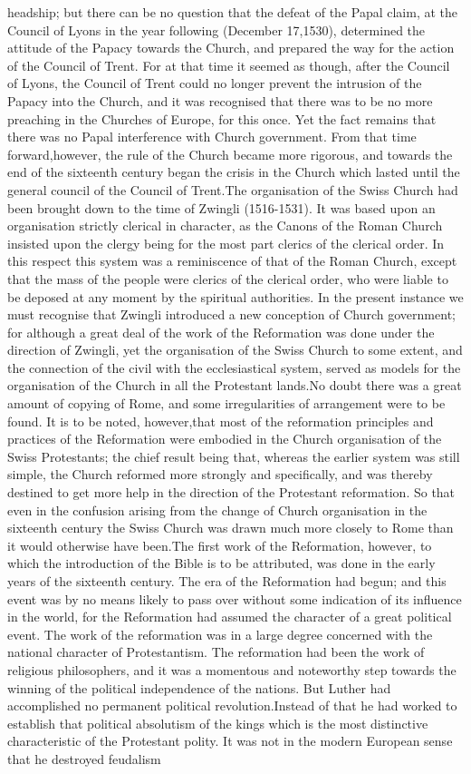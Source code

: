 \documentclass[a4paper]{article}
\begin{document}
headship; but there can be no question that the defeat of the Papal claim, at the Council of Lyons in the year following (December 17,1530), determined the attitude of the Papacy towards the Church, and prepared the way for the action of the Council of Trent. For at that time it seemed as though, after the Council of Lyons, the Council of Trent could no longer prevent the intrusion of the Papacy into the Church, and it was recognised that there was to be no more preaching in the Churches of Europe, for this once. Yet the fact remains that there was no Papal interference with Church government. From that time forward,however, the rule of the Church became more rigorous, and towards the end of the sixteenth century began the crisis in the Church which lasted until the general council of the Council of Trent.The organisation of the Swiss Church had been brought down to the time of Zwingli (1516-1531). It was based upon an organisation strictly clerical in character, as the Canons of the Roman Church insisted upon the clergy being for the most part clerics of the clerical order. In this respect this system was a reminiscence of that of the Roman Church, except that the mass of the people were clerics of the clerical order, who were liable to be deposed at any moment by the spiritual authorities. In the present instance we must recognise that Zwingli introduced a new conception of Church government; for although a great deal of the work of the Reformation was done under the direction of Zwingli, yet the organisation of the Swiss Church to some extent, and the connection of the civil with the ecclesiastical system, served as models for the organisation of the Church in all the Protestant lands.No doubt there was a great amount of copying of Rome, and some irregularities of arrangement were to be found. It is to be noted, however,that most of the reformation principles and practices of the Reformation were embodied in the Church organisation of the Swiss Protestants; the chief result being that, whereas the earlier system was still simple, the Church reformed more strongly and specifically, and was thereby destined to get more help in the direction of the Protestant reformation. So that even in the confusion arising from the change of Church organisation in the sixteenth century the Swiss Church was drawn much more closely to Rome than it would otherwise have been.The first work of the Reformation, however, to which the introduction of the Bible is to be attributed, was done in the early years of the sixteenth century. The era of the Reformation had begun; and this event was by no means likely to pass over without some indication of its influence in the world, for the Reformation had assumed the character of a great political event. The work of the reformation was in a large degree concerned with the national character of Protestantism. The reformation had been the work of religious philosophers, and it was a momentous and noteworthy step towards the winning of the political independence of the nations. But Luther had accomplished no permanent political revolution.Instead of that he had worked to establish that political absolutism of the kings which is the most distinctive characteristic of the Protestant polity. It was not in the modern European sense that he destroyed feudalism 
\end{document}
